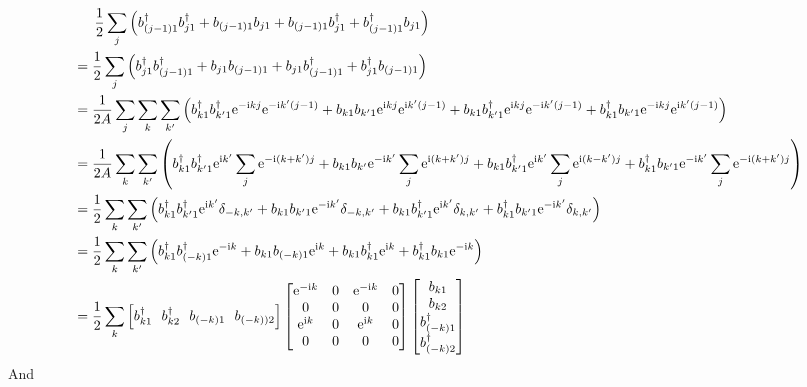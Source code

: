 \documentclass[letterpaper,10pt]{article}
\newcommand{\e}{\mathrm{e}}
\newcommand{\ii}{\mathrm{i}}
\begin{document}
$$\begin{aligned}
    & \indent  \frac{1}{2}\sum_{j}\left(b_{(j-1)1}^{\dagger}b_{j1}^{\dagger}+b_{(j-1)1}b_{j1}+b_{(j-1)1}b_{j1}^{\dagger}+b_{(j-1)1}^{\dagger}b_{j1}\right)\\
    &= \frac{1}{2}\sum_{j}\left(b_{j1}^{\dagger}b_{(j-1)1}^{\dagger}+b_{j1}b_{(j-1)1}+b_{j1}b_{(j-1)1}^{\dagger}+b_{j1}^{\dagger}b_{(j-1)1}\right)\\
    &=\frac{1}{2A}\sum_{j}\sum_{k}\sum_{k'}\left(b_{k1}^{\dagger}b_{k'1}^{\dagger}\e^{-\ii kj}\e^{-\ii k'(j-1)}+b_{k1}b_{k'1}\e^{\ii kj}\e^{\ii k'(j-1)}+b_{k1}b_{k'1}^{\dagger}\e^{\ii kj}\e^{-\ii k'(j-1)}+b_{k1}^{\dagger}b_{k'1}\e^{-\ii kj}\e^{\ii k'(j-1)}\right)\\
    &=\frac{1}{2A}\sum_{k}\sum_{k'}\left(b_{k1}^{\dagger}b_{k'1}^{\dagger}\e^{\ii k'}\sum_j \e^{-\ii (k+k')j}+b_{k1}b_{k'}\e^{-\ii k'}\sum_j \e^{\ii (k+k')j}+b_{k1}b_{k'1}^{\dagger}\e^{\ii k'}\sum_j \e^{\ii (k-k')j}+b_{k1}^{\dagger}b_{k'1}\e^{-\ii k'}\sum_j \e^{-\ii (k+k')j}\right)\\
    &=\frac{1}{2}\sum_k\sum_{k'}\left(b_{k1}^{\dagger}b_{k'1}^{\dagger}\e^{\ii k'}\delta_{-k,k'}+b_{k1}b_{k'1}\e^{-\ii k'}\delta_{-k,k'}+b_{k1}b_{k'1}^{\dagger}\e^{\ii k'}\delta_{k,k'}+b_{k1}^{\dagger}b_{k'1}\e^{-\ii k'}\delta_{k,k'}\right)\\
    &=\frac{1}{2}\sum_k\sum_{k'}\left(b_{k1}^{\dagger}b_{(-k)1}^{\dagger}\e^{-\ii k}+b_{k1}b_{(-k)1}\e^{\ii k}+b_{k1}b_{k1}^{\dagger}\e^{\ii k}+b_{k1}^{\dagger}b_{k1}\e^{-\ii k}\right)\\
    &=\frac{1}{2}\sum_k \left[
      b_{k1}^{\dagger} \ \ 
      b_{k2}^{\dagger}\  \ 
      b_{(-k)1}\ \ 
      b_{(-k))2}\right]
     \begin{bmatrix}
          \e^{-\ii k} & 0 & \e^{-\ii k} & 0 \\
         0 &  0 & 0 &0 \\
         \e^{\ii k} &  0 & \e^{\ii k} &0\\
          0 & 0 & 0& 0
          \end{bmatrix}\begin{bmatrix}
              b_{k1}  \\
              b_{k2}  \\
              b_{(-k)1}^{\dagger}\\
              b_{(-k)2}^{\dagger}
              \end{bmatrix}
  \end{aligned}
  $$
And
\end{document}
